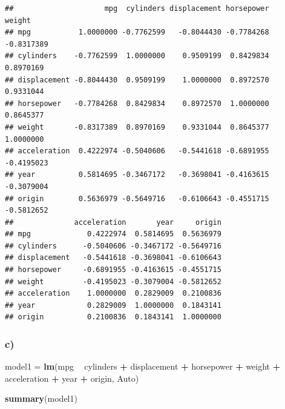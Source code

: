 \documentclass[]{article}
\newenvironment{Shaded}{\begin{snugshade}}{\end{snugshade}}
\newcommand{\KeywordTok}[1]{\textcolor[rgb]{0.13,0.29,0.53}{\textbf{#1}}}
\newcommand{\StringTok}[1]{\textcolor[rgb]{0.31,0.60,0.02}{#1}}
\newcommand{\OperatorTok}[1]{\textcolor[rgb]{0.81,0.36,0.00}{\textbf{#1}}}
\newcommand{\NormalTok}[1]{#1}
\begin{document}
\begin{verbatim}
##                     mpg  cylinders displacement horsepower     weight
## mpg           1.0000000 -0.7762599   -0.8044430 -0.7784268 -0.8317389
## cylinders    -0.7762599  1.0000000    0.9509199  0.8429834  0.8970169
## displacement -0.8044430  0.9509199    1.0000000  0.8972570  0.9331044
## horsepower   -0.7784268  0.8429834    0.8972570  1.0000000  0.8645377
## weight       -0.8317389  0.8970169    0.9331044  0.8645377  1.0000000
## acceleration  0.4222974 -0.5040606   -0.5441618 -0.6891955 -0.4195023
## year          0.5814695 -0.3467172   -0.3698041 -0.4163615 -0.3079004
## origin        0.5636979 -0.5649716   -0.6106643 -0.4551715 -0.5812652
##              acceleration       year     origin
## mpg             0.4222974  0.5814695  0.5636979
## cylinders      -0.5040606 -0.3467172 -0.5649716
## displacement   -0.5441618 -0.3698041 -0.6106643
## horsepower     -0.6891955 -0.4163615 -0.4551715
## weight         -0.4195023 -0.3079004 -0.5812652
## acceleration    1.0000000  0.2829009  0.2100836
## year            0.2829009  1.0000000  0.1843141
## origin          0.2100836  0.1843141  1.0000000
\end{verbatim}

\subsubsection{c)}\label{c-2}

\begin{Shaded}
\begin{Highlighting}[]
\NormalTok{model1 =}\StringTok{ }\KeywordTok{lm}\NormalTok{(mpg }\OperatorTok{~}\StringTok{ }\NormalTok{cylinders }\OperatorTok{+}\StringTok{ }\NormalTok{displacement }\OperatorTok{+}\StringTok{ }\NormalTok{horsepower }\OperatorTok{+}\StringTok{ }\NormalTok{weight }\OperatorTok{+}\StringTok{ }\NormalTok{acceleration }\OperatorTok{+}\StringTok{ }\NormalTok{year }\OperatorTok{+}\StringTok{ }\NormalTok{origin, Auto)}

\KeywordTok{summary}\NormalTok{(model1)}
\end{Highlighting}
\end{Shaded}
\end{document}
